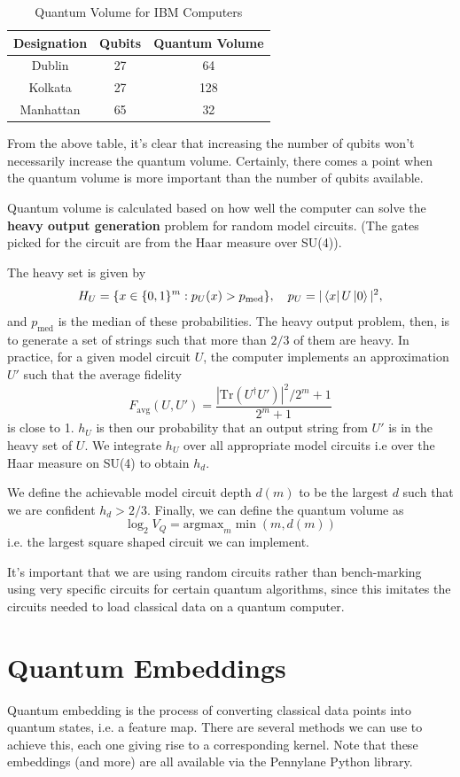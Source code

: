 \documentclass{article}
\theoremstyle{definition}
\begin{document}
\begin{table}[htb]
    \centering
    \begin{tabular}{ccc}
         Designation & Qubits & Quantum Volume  \\
        \hline
        Dublin & 27 & 64 \\
        Kolkata & 27 & 128 \\
        Manhattan & 65 & 32 
    \end{tabular}
    \caption{Quantum Volume for IBM Computers}
    \label{tab:quantum_volume_ibm}
\end{table}

From the above table, it's clear that increasing the number of qubits won't necessarily increase the quantum volume. Certainly, there comes a point when the quantum volume is more important than the number of qubits available.

Quantum volume is calculated based on how well the computer can solve the \textbf{heavy output generation} problem for random model circuits. (The gates picked for the circuit are from the Haar measure over SU(4)). 

The heavy set is given by
\[
H_U = \{ x \in \{0, 1\}^m : p_U (x) > p_{\text{med}} \}, \quad p_U = | \bra{x} U \ket{0} |^2,
\]
and $p_{\text{med}}$ is the median of these probabilities. The heavy output problem, then, is to generate a set of strings such that more than $2/3$ of them are heavy. In practice, for a given model circuit $U$, the computer implements an approximation $U'$ such that the average fidelity
\[
F_{\text{avg}} (U, U') = \frac{|\text{Tr} (U^\dagger U')|^2 / 2^m + 1}{2^m + 1}
\]
is close to 1. $h_U$ is then our probability that an output string from $U'$ is in the heavy set of $U$. We integrate $h_U$ over all appropriate model circuits i.e over the Haar measure on SU(4) to obtain $h_d$.

We define the achievable model circuit depth $d(m)$ to be the largest $d$ such that we are confident $h_d > 2/3$. Finally, we can define the quantum volume as
\[
\log_2 V_Q = \text{argmax}_m \min (m, d(m)) 
\]
i.e. the largest square shaped circuit we can implement. 

It's important that we are using random circuits rather than bench-marking using very specific circuits for certain quantum algorithms, since this imitates the circuits needed to load classical data on a quantum computer. 


\section{Quantum Embeddings}
Quantum embedding is the process of converting classical data points into quantum states, i.e. a feature map. There are several methods we can use to achieve this, each one giving rise to a corresponding kernel. Note that these embeddings (and more) are all available via the Pennylane Python library.
\end{document}
